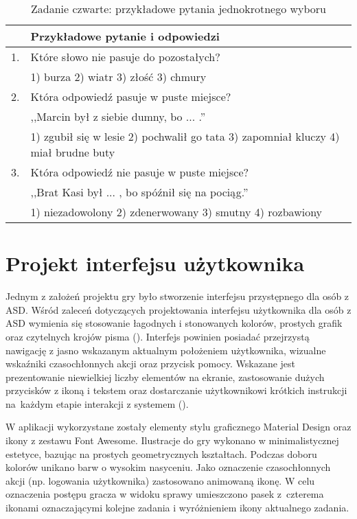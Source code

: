     \begin{table}
        \begin{tabularx}{\textwidth}{ l X }
         \hline
        
         \hline
            & \textbf{Przykładowe pytanie i odpowiedzi} \\
         \hline
         1. & Które słowo nie pasuje do pozostałych? \\
            & 1) burza 2) wiatr 3) złość 3) chmury \\
         2. & Która odpowiedź pasuje w puste miejsce? \\
            & ,,Marcin był z siebie dumny, bo ... .'' \\
            & 1) zgubił się w lesie 2) pochwalił go tata 3) zapomniał kluczy 4) miał brudne buty \\
         3. & Która odpowiedź nie pasuje w puste miejsce? \\
            & ,,Brat Kasi był ... , bo spóźnił się na pociąg.'' \\
            & 1) niezadowolony 2) zdenerwowany 3) smutny 4) rozbawiony  \\
         \hline
         
         \hline
        \end{tabularx}
        \caption{Zadanie czwarte: przykładowe pytania jednokrotnego wyboru}
        \label{table:zadanie4}
    \end{table}

\section{Projekt interfejsu użytkownika}
    Jednym z założeń projektu gry było stworzenie interfejsu przystępnego dla osób z ASD.
    Wśród zaleceń dotyczących projektowania interfejsu użytkownika dla osób z ASD wymienia się stosowanie łagodnych i stonowanych kolorów, prostych grafik oraz czytelnych krojów pisma (\cite{pavlov2014user}).
    Interfejs powinien posiadać przejrzystą nawigację z jasno wskazanym aktualnym położeniem użytkownika, wizualne wskaźniki czasochłonnych akcji oraz przycisk pomocy.
    Wskazane jest prezentowanie niewielkiej liczby elementów na ekranie, zastosowanie dużych przycisków z ikoną i tekstem oraz dostarczanie użytkownikowi krótkich instrukcji na~każdym etapie interakcji z systemem (\cite{pavlov2014user}).
    
    W aplikacji wykorzystane zostały elementy stylu graficznego Material Design oraz ikony z zestawu Font Awesome.
    Ilustracje do gry wykonano w minimalistycznej estetyce, bazując na prostych geometrycznych kształtach.
    Podczas doboru kolorów unikano barw o wysokim nasyceniu.
    Jako oznaczenie czasochłonnych akcji (np. logowania użytkownika) zastosowano animowaną ikonę.
    W celu oznaczenia postępu gracza w widoku sprawy umieszczono pasek z~czterema ikonami oznaczającymi kolejne zadania i wyróżnieniem ikony aktualnego zadania.
    
